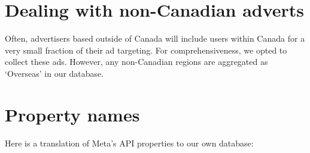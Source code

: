 \documentclass[
  letterpaper,
  DIV=11,
  numbers=noendperiod]{scrreprt}
\begin{document}
\section{Dealing with non-Canadian
adverts}\label{dealing-with-non-canadian-adverts}

Often, advertisers based outside of Canada will include users within
Canada for a very small fraction of their ad targeting. For
comprehensiveness, we opted to collect these ads. However, any
non-Canadian regions are aggregated as `Overseas' in our database.

\section{Property names}\label{property-names}

Here is a translation of Meta's API properties to our own database:
\end{document}

